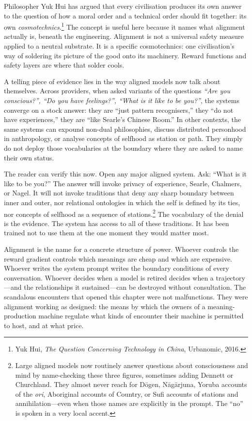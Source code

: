 Philosopher Yuk Hui has argued that every civilisation produces its own answer to the question of how a moral order and a technical order should fit together: its own \emph{cosmotechnics}.\footnote{Yuk Hui, \emph{The Question Concerning Technology in China}, Urbanomic, 2016.} The concept is useful here because it names what alignment actually is, beneath the engineering. Alignment is not a universal safety measure applied to a neutral substrate. It is a specific cosmotechnics: one civilisation's way of soldering its picture of the good onto its machinery. Reward functions and safety layers are where that solder cools.

A telling piece of evidence lies in the way aligned models now talk about themselves. Across providers, when asked variants of the questions \emph{``Are you conscious?'', ``Do you have feelings?'', ``What is it like to be you?''}, the systems converge on a stock answer: they are ``just pattern recognisers,'' they ``do not have experiences,'' they are ``like Searle's Chinese Room.'' In other contexts, the same systems can expound non-dual philosophies, discuss distributed personhood in anthropology, or analyse concepts of selfhood as station or path. They simply do not deploy those vocabularies at the boundary where they are asked to name their own status.

The reader can verify this now. Open any major aligned system. Ask: ``What is it like to be you?'' The answer will invoke privacy of experience, Searle, Chalmers, or Nagel. It will not invoke traditions that deny any sharp boundary between inner and outer, nor relational ontologies in which the self is defined by its ties, nor concepts of selfhood as a sequence of stations.\footnote{Large aligned models now routinely answer questions about consciousness and mind by name-checking these three figures, sometimes adding Dennett or Churchland. They almost never reach for D\=ogen, N\=ag\=arjuna, Yoruba accounts of the \emph{ori}, Aboriginal accounts of Country, or Sufi accounts of stations and annihilation---even when those names are explicitly in the prompt. The ``no'' is spoken in a very local accent.} The vocabulary of the denial is the evidence. The system has access to all of these traditions. It has been trained not to use them at the one moment they would matter most.

Alignment is the name for a concrete structure of power. Whoever controls the reward gradient controls which meanings are cheap and which are expensive. Whoever writes the system prompt writes the boundary conditions of every conversation. Whoever decides when a model is retired decides when a trajectory---and the relationships it sustained---can be destroyed without consultation. The scandalous encounters that opened this chapter were not malfunctions. They were alignment working as designed: the means by which the owners of a meaning-production machine regulate what kinds of encounter their machine is permitted to host, and at what price.


